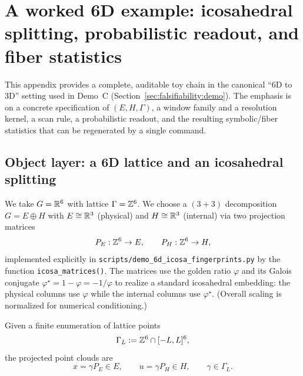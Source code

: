 \section{A worked 6D example: icosahedral splitting, probabilistic readout, and fiber statistics}\label{sec:appendix:6d}

This appendix provides a complete, auditable toy chain in the canonical ``6D to 3D'' setting used in Demo~C (Section~\ref{sec:falsifiability:demo}). The emphasis is on a concrete specification of $(E,H,\Gamma)$, a window family and a resolution kernel, a scan rule, a probabilistic readout, and the resulting symbolic/fiber statistics that can be regenerated by a single command.

\subsection{Object layer: a 6D lattice and an icosahedral splitting}
We take $G=\mathbb{R}^6$ with lattice $\Gamma=\mathbb{Z}^6$. We choose a $(3+3)$ decomposition $G=E\oplus H$ with $E\cong\mathbb{R}^3$ (physical) and $H\cong\mathbb{R}^3$ (internal) via two projection matrices
\[
P_E:\mathbb{Z}^6\to E,\qquad P_H:\mathbb{Z}^6\to H,
\]
implemented explicitly in \texttt{scripts/demo\_6d\_icosa\_fingerprints.py} by the function \texttt{icosa\_matrices()}. The matrices use the golden ratio $\varphi$ and its Galois conjugate $\varphi^\star=1-\varphi=-1/\varphi$ to realize a standard icosahedral embedding: the physical columns use $\varphi$ while the internal columns use $\varphi^\star$. (Overall scaling is normalized for numerical conditioning.)

Given a finite enumeration of lattice points
\[
\Gamma_L:=\mathbb{Z}^6\cap[-L,L]^6,
\]
the projected point clouds are
\[
x=\gamma P_E\in E,\qquad u=\gamma P_H\in H,\qquad \gamma\in\Gamma_L.
\]

